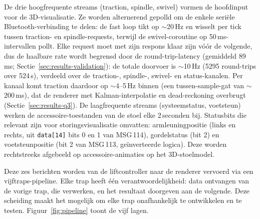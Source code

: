 \documentclass[10pt, a4paper, twocolumn]{article}
\begin{document}
De drie hoogfrequente streams (traction, spindle, swivel) vormen de hoofdinput
voor de 3D-visualisatie. Ze worden alternerend gepolld om de enkele seriële Bluetooth-verbinding te delen:
de fast loop tikt op $\sim$20\,Hz en wisselt per tick tussen traction- en
spindle-requests, terwijl de swivel-coroutine op 50\,ms-intervallen pollt. Elke
request moet met zijn respons klaar zijn vóór de volgende, dus de haalbare rate
wordt begrensd door de round-trip-latency (gemiddeld 89\,ms;
Sectie~\ref{sec:results-validation}): de totale doorvoer is $\sim$10\,Hz (5295
round-trips over 524\,s), verdeeld over de traction-, spindle-, swivel- en
status-kanalen. Per kanaal komt traction daardoor op $\sim$4--5\,Hz binnen (een
tussen-sample-gat van $\sim$200\,ms), dat de renderer met Kalman-interpolatie en
dead-reckoning overbrugt (Sectie~\ref{sec:results-q3}). De laagfrequente streams (systeemstatus,
voetsteun) werken de accessoire-toestanden van de stoel elke 2\,seconden bij.
Statusbits die relevant zijn voor storingsvisualisatie omvatten:
armleuningpositie (links en rechts, uit \texttt{data[14]} bits 0 en 1 van
MSG\,114), gordelstatus (bit 2) en voetsteunpositie (bit 2 van MSG\,113,
geïnverteerde logica). Deze worden rechtstreeks afgebeeld op
accessoire-animaties op het 3D-stoelmodel.

Deze zes berichten worden van de liftcontroller naar de renderer vervoerd via
een vijftraps-pipeline. Elke trap heeft één verantwoordelijkheid: data ontvangen
van de vorige trap, die verwerken, en het resultaat doorgeven aan de volgende.
Deze scheiding maakt het mogelijk om elke trap onafhankelijk te ontwikkelen en
te testen. Figuur~\ref{fig:pipeline} toont de vijf lagen.
\end{document}
